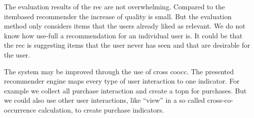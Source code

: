 The evaluation results of the \gls{rec} are not overwhelming. Compared to the \gls{itembased} recommender the increase of quality is small. But the evaluation method only considers items that the users already liked as relevant. We do not know how use-full a recommendation for an individual user is. It could be that the \gls{rec} is suggesting items that the user never has seen and that are desirable for the user.

The system may be improved through the use of cross \gls{coocc}. The presented recommender engine maps every type of user interaction to one \gls{indicator}. For example we collect all purchase interaction and create a \gls{topn} for purchases. But we could also use other user interactions, like ``view'' in a so called cross-co-occurrence calculation, to create purchase indicators. 

